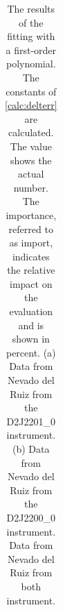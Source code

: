 \documentclass  [
  paper    = a4,
  BCOR     = 10mm,
  twoside,
  fontsize = 12pt,
  fleqn,
  toc      = bibnumbered,
  toc      = listofnumbered,
  numbers  = noendperiod,
  headings = normal,
  listof   = leveldown,
  version  = 3.03
]                                       {scrreprt}
\begin{document}
\begin{table}[h!]
{\begin{tabular}{cc}
			\bottomrule
	\end{tabular}}
	\label{tab:coefNevad}
	\caption{
		The results of the fitting with a first-order polynomial. 
		The constants of \cref{calc:delterr} are calculated.
		The value shows the actual number. The importance,  referred to as import, indicates the relative impact on the evaluation and is shown in percent.
		(a) Data from Nevado del Ruiz from the D2J2201\_0 instrument. 
		(b) Data from Nevado del Ruiz from the D2J2200\_0 instrument.  %
		Data from Nevado del Ruiz from both instrument. 
	}    
\end{table}    
\end{document}
